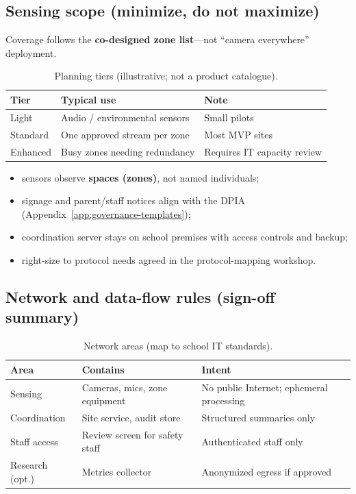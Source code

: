 \subsection{Sensing scope (minimize, do not maximize)}

Coverage follows the \textbf{co-designed zone list}---not ``camera everywhere'' deployment.

\begin{table}[htbp]
  \centering
  \caption{Planning tiers (illustrative; not a product catalogue).}
  \label{tab:capability-tiers}
  \small
  \begin{tabular}{@{}p{2.6cm}p{4.2cm}p{4.8cm}@{}}
    \toprule
    Tier & Typical use & Note \\
    \midrule
    Light & Audio / environmental sensors & Small pilots \\
    Standard & One approved stream per zone & Most MVP sites \\
    Enhanced & Busy zones needing redundancy & Requires IT capacity review \\
    \bottomrule
  \end{tabular}
\end{table}

\begin{itemize}[noitemsep]
  \item sensors observe \textbf{spaces (zones)}, not named individuals;
  \item signage and parent/staff notices align with the DPIA (Appendix~\ref{app:governance-templates});
  \item coordination server stays on school premises with access controls and backup;
  \item right-size to protocol needs agreed in the protocol-mapping workshop.
\end{itemize}

\subsection{Network and data-flow rules (sign-off summary)}

\begin{table}[htbp]
  \centering
  \caption{Network areas (map to school IT standards).}
  \label{tab:trust-zones}
  \small
  \begin{tabular}{@{}p{2.4cm}p{3.6cm}p{4.8cm}@{}}
    \toprule
    Area & Contains & Intent \\
    \midrule
    Sensing & Cameras, mics, zone equipment & No public Internet; ephemeral processing \\
    Coordination & Site service, audit store & Structured summaries only \\
    Staff access & Review screen for safety staff & Authenticated staff only \\
    Research (opt.) & Metrics collector & Anonymized egress if approved \\
    \bottomrule
  \end{tabular}
\end{table}


